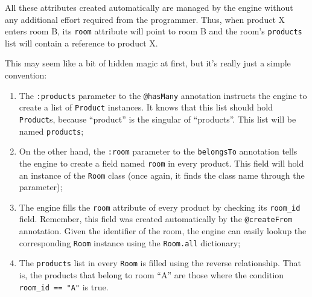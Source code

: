 \documentclass[a4,11pt]{report}
\begin{document}
All these attributes created automatically are managed by the engine
without any additional effort required from the programmer. Thus, when
product X enters room B, its \verb=room= attribute will point to room
B and the room's \verb=products= list will contain a reference to
product X.

This may seem like a bit of hidden magic at first, but it's really
just a simple convention:

\begin{enumerate}
\item The \verb=:products= parameter to the \verb=@hasMany= annotation
  instructs the engine to create a list of \verb=Product=
  instances. It knows that this list should hold \verb=Product=s,
  because ``product'' is the singular of ``products''. This list will
  be named \verb=products=;
\item On the other hand, the \verb=:room= parameter to the
  \verb=belongsTo= annotation tells the engine to create a field named
  \verb=room= in every product. This field will hold an instance of the
  \verb=Room= class (once again, it finds the class name through the
  parameter);
\item The engine fills the \verb=room= attribute of every product by
  checking its \verb=room_id= field. Remember, this field was created
  automatically by the \verb=@createFrom= annotation. Given the
  identifier of the room, the engine can easily lookup the
  corresponding \verb=Room= instance using the \verb=Room.all=
  dictionary;
\item The \verb=products= list in every \verb=Room= is filled using
  the reverse relationship. That is, the products that belong to room
  ``A'' are those where the condition \verb!room_id == "A"! is true.
\end{enumerate}
\end{document}
